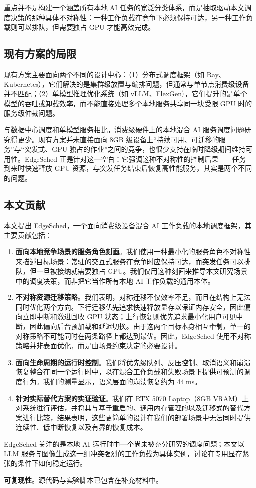重点并不是构建一个涵盖所有本地 AI 任务的宽泛分类体系，而是抽取驱动本文调度决策的那种具体不对称性：一种工作负载在竞争下必须保持可达，另一种工作负载则可以排队，但需要独占 GPU 才能高效完成。

\subsection{现有方案的局限}

现有方案主要面向两个不同的设计中心：（1）分布式调度框架（如 Ray、Kubernetes），它们解决的是集群级放置与编排问题，但通常与单节点消费级设备并不匹配；（2）单模型推理优化系统（如 vLLM、FlexGen），它们提升的是单个模型的吞吐或卸载效率，而不能直接处理多个本地服务共享同一块受限 GPU 时的服务级仲裁问题。

与数据中心调度和单模型服务相比，消费级硬件上的本地混合 AI 服务调度问题研究得更少。现有方案并未直接面向 8GB 级设备上“持续可用、可迁移的服务”与“突发式、GPU 独占的作业”之间的竞争，也很少支持在临时降级期间维持可用性。EdgeSched 正是针对这一空白：它强调这种不对称性的控制后果——任务到来时快速释放 GPU 资源，与突发任务结束后恢复高性能服务，其实是两个不同的问题。

\subsection{本文贡献}

本文提出 EdgeSched，一个面向消费级设备混合 AI 工作负载的本地调度框架，其主要贡献包括：

\begin{enumerate}
\item \textbf{面向本地竞争场景的服务角色刻画}。我们使用一种最小化的服务角色不对称性来描述目标场景：常驻的交互式服务在竞争时应保持可达，而突发任务可以排队，但一旦被接纳就需要独占 GPU。我们仅用这种刻画来推导本文研究场景中的调度决策，而非把它当作所有本地 AI 工作负载的通用本体。

\item \textbf{不对称资源迁移策略}。我们表明，对称迁移不仅效率不足，而且在结构上无法同时优化两个方向。下行迁移优先追求快速释放显存以保证内存安全，因此偏向立即中断和激进回收 GPU 状态；上行恢复则优先追求最小化用户可见中断，因此偏向后台预加载和延迟切换。由于这两个目标本身相互牵制，单一的对称策略不可能同时在两条路径上都达到最优。因此，EdgeSched 使用不对称策略并非表面优化，而是由场景约束决定的必要设计。

\item \textbf{面向生命周期的运行时控制}。我们将优先级队列、反压控制、取消语义和崩溃恢复整合在同一个运行时中，以在混合工作负载和失败场景下提供可预测的调度行为。我们的测量显示，语义层面的崩溃恢复约为 44 ms。

\item \textbf{针对实际替代方案的实证验证}。我们在 RTX 5070 Laptop（8GB VRAM）上对系统进行评估，并将其与基于重启的、通用内存管理的以及迁移式的替代方案进行比较，结果表明，这些更简单的设计在我们的部署场景中无法同时提供连续性、低中断恢复以及有界的恢复成本。
\end{enumerate}

EdgeSched 关注的是本地 AI 运行时中一个尚未被充分研究的调度问题；本文以 LLM 服务与图像生成这一组冲突强烈的工作负载为具体实例，讨论在专用显存紧张的条件下如何稳定运行。

\textbf{可复现性}。源代码与实验脚本已包含在补充材料中。